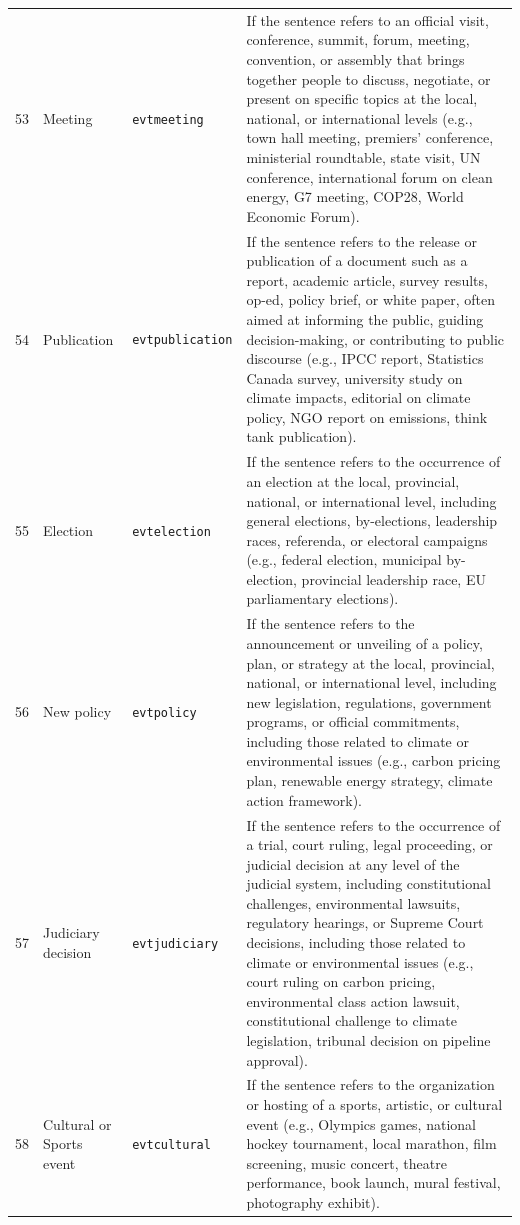\documentclass[12pt]{article}
\renewcommand\_{\texttt{\detokenize{_}\allowbreak}}
\begin{document}
{\begin{longtable}{p{0.5cm}p{4.5cm}p{2.8cm}p{13.5cm}}
53 & Meeting & \texttt{evt\_meeting} & If the sentence refers to an official visit, conference, summit, forum, meeting, convention, or assembly that brings together people to discuss, negotiate, or present on specific topics at the local, national, or international levels (e.g., town hall meeting, premiers' conference, ministerial roundtable, state visit, UN conference, international forum on clean energy, G7 meeting, COP28, World Economic Forum). \\
54 & Publication & \texttt{evt\_publication} & If the sentence refers to the release or publication of a document such as a report, academic article, survey results, op-ed, policy brief, or white paper, often aimed at informing the public, guiding decision-making, or contributing to public discourse (e.g., IPCC report, Statistics Canada survey, university study on climate impacts, editorial on climate policy, NGO report on emissions, think tank publication). \\
55 & Election & \texttt{evt\_election} & If the sentence refers to the occurrence of an election at the local, provincial, national, or international level, including general elections, by-elections, leadership races, referenda, or electoral campaigns (e.g., federal election, municipal by-election, provincial leadership race, EU parliamentary elections). \\
56 & New policy & \texttt{evt\_policy} & If the sentence refers to the announcement or unveiling of a policy, plan, or strategy at the local, provincial, national, or international level, including new legislation, regulations, government programs, or official commitments, including those related to climate or environmental issues (e.g., carbon pricing plan, renewable energy strategy, climate action framework). \\
57 & Judiciary decision & \texttt{evt\_judiciary} & If the sentence refers to the occurrence of a trial, court ruling, legal proceeding, or judicial decision at any level of the judicial system, including constitutional challenges, environmental lawsuits, regulatory hearings, or Supreme Court decisions, including those related to climate or environmental issues (e.g., court ruling on carbon pricing, environmental class action lawsuit, constitutional challenge to climate legislation, tribunal decision on pipeline approval). \\
58 & Cultural or Sports event & \texttt{evt\_cultural} & If the sentence refers to the organization or hosting of a sports, artistic, or cultural event (e.g., Olympics games, national hockey tournament, local marathon, film screening, music concert, theatre performance, book launch, mural festival, photography exhibit). \\

\end{longtable}}
\end{document}
